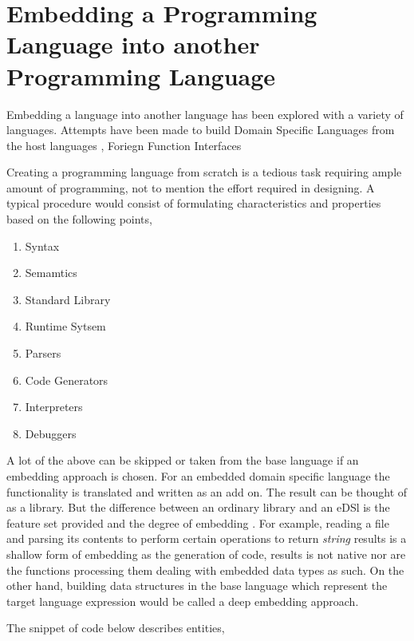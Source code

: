 \documentclass[proposal.tex]{subfiles}
\begin{document}
\section{Embedding a Programming Language into another Programming Language}\label{sect:eplipl}
Embedding a language into another language has been explored with a variety of languages. Attempts have been made to build Domain Specific Languages from the host languages \cite{hudak1996building}, Foriegn Function Interfaces \cite{barzilay2004foreign} 

Creating a programming language from scratch is a tedious task requiring ample amount of programming, not to mention the effort required in 
designing. A typical procedure would consist of formulating characteristics and properties based on the following points,

\begin{enumerate}
\item Syntax
\item Semamtics
\item Standard Library
\item Runtime Sytsem
\item Parsers
\item Code Generators
\item Interpreters
\item Debuggers
\end{enumerate}

A lot of the above can be skipped or taken from the base language if an embedding approach is chosen. For an embedded domain specific 
language the functionality is translated and written as an add on. The result can be thought of as a library. But the  
difference between an ordinary library and an eDSl is the feature set provided and the degree of embedding 
\cite{website:eDSLhaskellwiki}. For example, reading a file and parsing its contents to perform certain operations to return 
\textit{string} results is a shallow form of embedding as the generation of code, results is not native nor are the functions processing 
them dealing with embedded data types as such. On the other hand, building data structures in the base language which represent the 
target language expression would be called a deep embedding approach.         

\par The snippet of  code below describes  entities,
\end{document}
